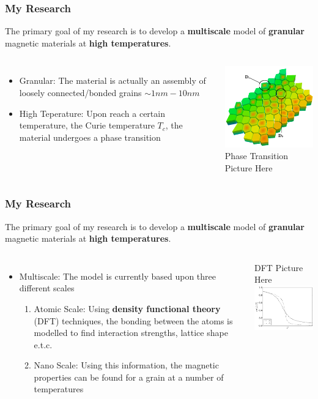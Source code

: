 \documentclass{beamer}
\begin{document}
\begin{frame}
	\frametitle{My Research}
	The primary goal of my research is to develop a \textbf{multiscale} model of \textbf{granular} magnetic materials at \textbf{high temperatures}.
	\begin{columns}
		\column{7cm}
		\begin{itemize}
			\item{Granular: The material is actually an assembly of loosely connected/bonded grains $\sim 1nm - 10nm$}\newline
			\item{High Teperature: Upon reach a certain temperature, the Curie temperature $T_c$, the material undergoes a phase transition}
		\end{itemize}
		\column{5cm}
		\includegraphics[width=4cm]{Images/grains2}\newline
		Phase Transition Picture Here
	\end{columns}
\end{frame}

\begin{frame}
	\frametitle{My Research}
	The primary goal of my research is to develop a \textbf{multiscale} model of \textbf{granular} magnetic materials at \textbf{high temperatures}.
	\begin{columns}
		\column{7cm}
		\begin{itemize}
			\item{Multiscale: The model is currently based upon three different scales}\newline
			\begin{enumerate}
				\item{Atomic Scale: Using \textbf{density functional theory} (DFT) techniques, the bonding between the atoms is modelled to find interaction strengths, lattice shape e.t.c.}\newline
				\item{Nano Scale: Using this information, the magnetic properties can be found for a grain at a number of temperatures}
			\end{enumerate}
		\end{itemize}
		\column{5cm}
		DFT Picture Here\newline
		\includegraphics[width=4cm]{Images/Ds_noinset}
	\end{columns}
\end{frame}
\end{document}
